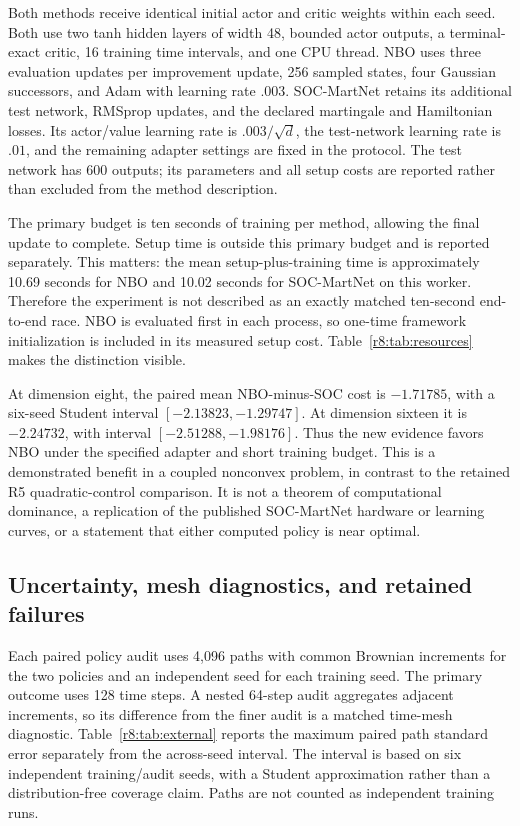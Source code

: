 Both methods receive identical initial actor and critic weights within each seed. Both use two tanh hidden layers of width 48, bounded actor outputs, a terminal-exact critic, 16 training time intervals, and one CPU thread. NBO uses three evaluation updates per improvement update, 256 sampled states, four Gaussian successors, and Adam with learning rate $.003$. SOC-MartNet retains its additional test network, RMSprop updates, and the declared martingale and Hamiltonian losses. Its actor/value learning rate is $.003/\sqrt d$, the test-network learning rate is $.01$, and the remaining adapter settings are fixed in the protocol. The test network has 600 outputs; its parameters and all setup costs are reported rather than excluded from the method description.

The primary budget is ten seconds of training per method, allowing the final update to complete. Setup time is outside this primary budget and is reported separately. This matters: the mean setup-plus-training time is approximately 10.69 seconds for NBO and 10.02 seconds for SOC-MartNet on this worker. Therefore the experiment is not described as an exactly matched ten-second end-to-end race. NBO is evaluated first in each process, so one-time framework initialization is included in its measured setup cost. Table~\ref{r8:tab:resources} makes the distinction visible.




At dimension eight, the paired mean NBO-minus-SOC cost is $-1.71785$, with a six-seed Student interval $[-2.13823,-1.29747]$. At dimension sixteen it is $-2.24732$, with interval $[-2.51288,-1.98176]$. Thus the new evidence favors NBO under the specified adapter and short training budget. This is a demonstrated benefit in a coupled nonconvex problem, in contrast to the retained R5 quadratic-control comparison. It is not a theorem of computational dominance, a replication of the published SOC-MartNet hardware or learning curves, or a statement that either computed policy is near optimal.

\subsection{Uncertainty, mesh diagnostics, and retained failures}
Each paired policy audit uses 4,096 paths with common Brownian increments for the two policies and an independent seed for each training seed. The primary outcome uses 128 time steps. A nested 64-step audit aggregates adjacent increments, so its difference from the finer audit is a matched time-mesh diagnostic. Table~\ref{r8:tab:external} reports the maximum paired path standard error separately from the across-seed interval. The interval is based on six independent training/audit seeds, with a Student approximation rather than a distribution-free coverage claim. Paths are not counted as independent training runs.

